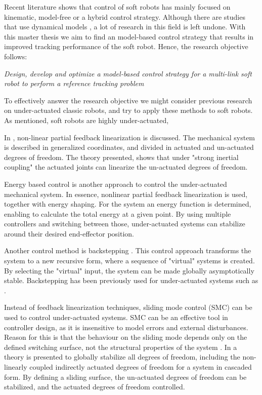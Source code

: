 Recent literature shows that control of soft robots has mainly focused on kinematic, model-free or a hybrid control strategy. Although there are studies that use dynamical models \cite{della2020model}, a lot of research in this field is left undone. With this master thesis we aim to find an model-based control strategy that results in improved tracking performance of the soft robot. Hence, the research objective follows:



\textit{Design, develop and optimize a model-based control strategy for a multi-link soft robot to perform a reference tracking problem}


To effectively answer the research objective we might consider previous research on under-actuated classic robots, and try to apply these methods to soft robots. As mentioned, soft robots are highly under-actuated,


In \cite{spong1994linear}, non-linear partial feedback linearization is discussed. The mechanical system is described in generalized coordinates, and divided in actuated and un-actuated degrees of freedom. The theory presented, shows that under "strong inertial coupling" the actuated joints can linearize the un-actuated degrees of freedom. 

Energy based control \cite{spong1996energy} is another approach to control the under-actuated mechanical system. In essence, nonlinear partial feedback linearization is used, together with energy shaping. For the system an energy function is determined, enabling to calculate the total energy at a given point. By using multiple controllers and switching between those, under-actuated systems can stabilize around their desired end-effector position. 

Another control method is backstepping \cite{khalil2002nonlinear}. This control approach transforms the system to a new recursive form, where a sequence of "virtual" systems is created. By selecting the "virtual" input, the system can be made globally asymptotically stable. Backstepping has been previously used for under-actuated systems such as \cite{madani2006backstepping}.


Instead of feedback linearization techniques, sliding mode control (SMC) can be used to control under-actuated systems. SMC can be an effective tool in controller design, as it is insensitive to model errors and external disturbances. Reason for this is that the behaviour on the sliding mode depends only on the defined switching surface, not the structural properties of the system \cite{liu2013survey}. In \cite{xu2008sliding} a theory is presented to globally stabilize all degrees of freedom, including the non-linearly coupled indirectly actuated degrees of freedom for a system in cascaded form. By defining a sliding surface, the un-actuated degrees of freedom can be stabilized, and the actuated degrees of freedom controlled.


